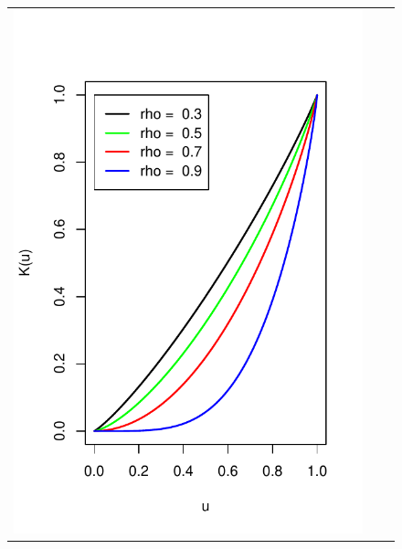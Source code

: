 \documentclass[12pt]{article}
\begin{document}
\begin{figure}[h]
\begin{tabular}{ccc}
\includegraphics[scale = 0.45, clip = true, trim = 0.05in 0 0.2in 0.6in]{extrapolation_figures/illus_rhos_Kfunc.pdf} &

\end{tabular}
\end{figure}
\end{document}
